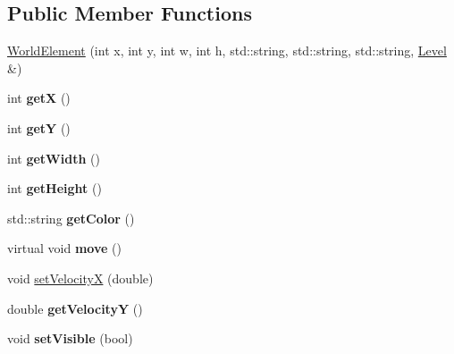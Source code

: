 \subsection*{Public Member Functions}
\begin{DoxyCompactItemize}
\item 
\hyperlink{classWorldElement_a33af28b392e681b405a502f9cc143bcd}{WorldElement} (int x, int y, int w, int h, std::string, std::string, std::string, \hyperlink{classLevel}{Level} \&)
\item 
\hypertarget{classWorldElement_a1fa36852afeae6c43863bbc5520f9f5d}{
int {\bfseries getX} ()}
\label{classWorldElement_a1fa36852afeae6c43863bbc5520f9f5d}

\item 
\hypertarget{classWorldElement_a9b29e364fd0e8c30c331ce688616e936}{
int {\bfseries getY} ()}
\label{classWorldElement_a9b29e364fd0e8c30c331ce688616e936}

\item 
\hypertarget{classWorldElement_a58ba5f1db3dfa32982cedc1a0777601a}{
int {\bfseries getWidth} ()}
\label{classWorldElement_a58ba5f1db3dfa32982cedc1a0777601a}

\item 
\hypertarget{classWorldElement_a4f2456415ac21024a3c468aa1833abb4}{
int {\bfseries getHeight} ()}
\label{classWorldElement_a4f2456415ac21024a3c468aa1833abb4}

\item 
\hypertarget{classWorldElement_ae386438d5067ae30d1c354f3c0472cf5}{
std::string {\bfseries getColor} ()}
\label{classWorldElement_ae386438d5067ae30d1c354f3c0472cf5}

\item 
\hypertarget{classWorldElement_a4d5ec8f863245a4689edaa90e86f28f3}{
virtual void {\bfseries move} ()}
\label{classWorldElement_a4d5ec8f863245a4689edaa90e86f28f3}

\item 
void \hyperlink{classWorldElement_a64f052dba6615d61bb277365a0e5c409}{setVelocityX} (double)
\item 
\hypertarget{classWorldElement_a60d9df54e0cccc1664d6b2fdf5219eee}{
double {\bfseries getVelocityY} ()}
\label{classWorldElement_a60d9df54e0cccc1664d6b2fdf5219eee}

\item 
\hypertarget{classWorldElement_a17875031e32f7fe7543b2d157fd06ef2}{
void {\bfseries setVisible} (bool)}
\label{classWorldElement_a17875031e32f7fe7543b2d157fd06ef2}


\end{DoxyCompactItemize}
